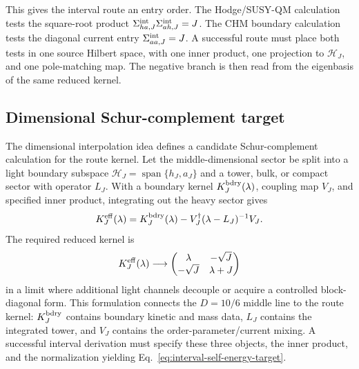 This gives the interval route an entry order.  The Hodge/SUSY-QM calculation
tests the square-root product
\(\Sigma_{ha,J}^{\rm int}\Sigma_{ah,J}^{\rm int}=J\).  The CHM boundary
calculation tests the diagonal current entry
\(\Sigma_{aa,J}^{\rm int}=J\).  A successful route must place both tests in
one source Hilbert space, with one inner product, one projection to
\(\mathcal H_J\), and one pole-matching map.  The negative branch is then read
from the eigenbasis of the same reduced kernel.

\subsection{Dimensional Schur-complement target}
\label{sec:kk-schur-target}

The dimensional interpolation idea defines a candidate Schur-complement
calculation for the route kernel.  Let the middle-dimensional sector be
split into a light boundary subspace \(\mathcal H_J=\operatorname{span}\{h_J,a_J\}\)
and a tower, bulk, or compact sector with operator \(L_J\).  With a boundary
kernel \(K^{\rm bdry}_J(\lambda)\), coupling map \(V_J\), and specified inner
product, integrating out the heavy sector gives
\begin{equation}
  K^{\rm eff}_J(\lambda)
  =
  K^{\rm bdry}_J(\lambda)
  -
  V_J^\dagger(\lambda-L_J)^{-1}V_J .
  \label{eq:interval-schur-complement}
\end{equation}
The required reduced kernel is
\begin{equation}
  K^{\rm eff}_J(\lambda)
  \longrightarrow
  \begin{pmatrix}
  \lambda&-\sqrt J\\
  -\sqrt J&\lambda+J
  \end{pmatrix}
  \label{eq:interval-schur-devries-target}
\end{equation}
in a limit where additional light channels decouple or acquire a controlled
block-diagonal form.  This formulation connects the \(D=10/6\) middle line to
the route kernel: \(K^{\rm bdry}_J\) contains boundary kinetic and mass data,
\(L_J\) contains the integrated tower, and \(V_J\) contains the
order-parameter/current mixing.  A successful interval derivation must specify
these three objects, the inner product, and the normalization yielding
Eq.~\eqref{eq:interval-self-energy-target}.

